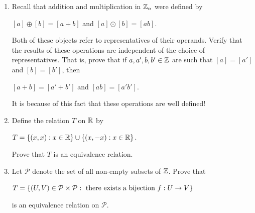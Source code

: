 \documentclass[11pt,fleqn,dvipsnames,usenames]{article}
\newcommand{\p}{\noindent}
\begin{document}
\begin{enumerate}
\item Recall that addition and multiplication in $\mathbb{Z}_n$ were defined by
\begin{center}
$[a] \oplus [b] = [a + b]$ and $[a]\odot [b] = [ab]$.
\end{center}
\p Both of these objects refer to representatives of their operands.  Verify that the results of these operations are independent of the choice of representatives.  That is, prove that if $a,a',b,b'\in\mathbb{Z}$ are such that $[a] = [a']$ and $[b] = [b']$, then
\begin{center}
$[a + b] = [a' + b']$ and $[ab] = [a'b']$.
\end{center}

\note It is because of this fact that these operations are well defined!


\item Define the relation $T$ on $\mathbb{R}$ by
\begin{center}
$T = \left\{(x,x): x\in\mathbb{R}\right\}\cup \left\{(x,-x): x\in\mathbb{R}\right\}$.
\end{center}
Prove that $T$ is an equivalence relation.

\item Let $\mathcal{P}$ denote the set of all non-empty subsets of $\mathbb{Z}$.  Prove that
\begin{center}
$T = \left\{(U,V)\in \mathcal{P}\times\mathcal{P}:\text{ there exists a bijection }f:U\to V\right\}$
\end{center}
is an equivalence relation on $\mathcal{P}$.
\vsmsp


\end{enumerate}
\end{document}
